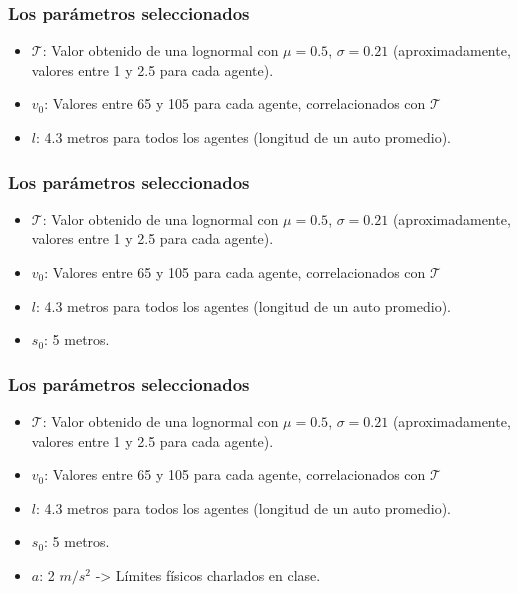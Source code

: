 \documentclass[10pt, compress]{beamer}
\begin{document}
\begin{frame}[fragile]

\frametitle{Los par\'ametros seleccionados}

\begin{itemize}

\item $\mathcal{T}$: Valor obtenido de una lognormal con $\mu = 0.5$, $\sigma = 0.21$ (aproximadamente, valores entre 1 y 2.5 para cada agente).
\item $v_0$: Valores entre 65 y 105 para cada agente, correlacionados con $\mathcal{T}$
\item $l$: 4.3 metros para todos los agentes (longitud de un auto promedio).

\end{itemize}
\addtocounter{framenumber}{-1}
\end{frame}

\begin{frame}[fragile]

\frametitle{Los par\'ametros seleccionados}

\begin{itemize}

\item $\mathcal{T}$: Valor obtenido de una lognormal con $\mu = 0.5$, $\sigma = 0.21$ (aproximadamente, valores entre 1 y 2.5 para cada agente).
\item $v_0$: Valores entre 65 y 105 para cada agente, correlacionados con $\mathcal{T}$
\item $l$: 4.3 metros para todos los agentes (longitud de un auto promedio).
\item $s_0$: 5 metros.

\end{itemize}
\addtocounter{framenumber}{-1}
\end{frame}

\begin{frame}[fragile]
\frametitle{Los par\'ametros seleccionados}

\begin{itemize}

\item $\mathcal{T}$: Valor obtenido de una lognormal con $\mu = 0.5$, $\sigma = 0.21$ (aproximadamente, valores entre 1 y 2.5 para cada agente).
\item $v_0$: Valores entre 65 y 105 para cada agente, correlacionados con $\mathcal{T}$
\item $l$: 4.3 metros para todos los agentes (longitud de un auto promedio).
\item $s_0$: 5 metros.
\item $a$: 2 $m/s^2$ -> Límites físicos charlados en clase.

\end{itemize}
\addtocounter{framenumber}{-1}
\end{frame}
\end{document}
